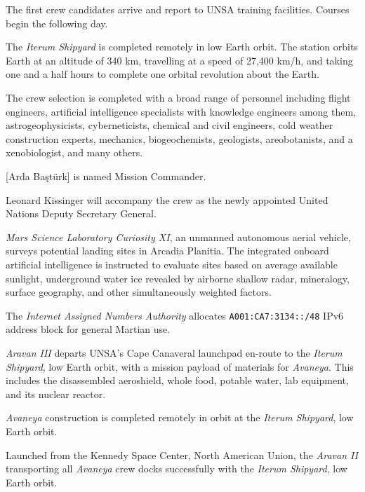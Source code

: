 The first crew candidates arrive and report to UNSA training facilities. Courses begin the following day.
\StopTimelineDate

The {\it Iterum Shipyard} is completed remotely in low Earth orbit. The station orbits Earth at an altitude of 340 km, travelling at a speed of 27,400 km/h, and taking one and a half hours to complete one orbital revolution about the Earth.
\StopTimelineDate

The crew selection is completed with a broad range of personnel including flight engineers, artificial intelligence specialists with knowledge engineers among them, astrogeophysicists, cyberneticists, chemical and civil engineers, cold weather construction experts, mechanics, biogeochemists, geologists, areobotanists, and a xenobiologist, and many others. 

[Arda Baştürk] is named Mission Commander. 

Leonard Kissinger will accompany the crew as the newly appointed United Nations Deputy Secretary General.
\StopTimelineDate

{\it Mars Science Laboratory Curiosity XI}, an unmanned autonomous aerial vehicle, surveys potential landing sites in Arcadia Planitia. The integrated onboard artificial intelligence is instructed to evaluate sites based on average available sunlight, underground water ice revealed by airborne shallow radar, mineralogy, surface geography, and other simultaneously weighted factors.
\StopTimelineDate

The {\it Internet Assigned Numbers Authority} allocates {\tt A001:CA7:3134::/48} IPv6 address block for general Martian use. 
\StopTimelineDate

{\it Aravan III} departs UNSA's Cape Canaveral launchpad en-route to the {\it Iterum Shipyard}, low Earth orbit, with a mission payload of materials for {\it Avaneya}. This includes the disassembled aeroshield, whole food, potable water, lab equipment, and its nuclear reactor.
\StopTimelineDate

{\it Avaneya} construction is completed remotely in orbit at the {\it Iterum Shipyard}, low Earth orbit.
\StopTimelineDate

Launched from the Kennedy Space Center, North American Union, the {\it Aravan II} transporting all {\it Avaneya} crew docks successfully with the {\it Iterum Shipyard}, low Earth orbit.
\StopTimelineDate

